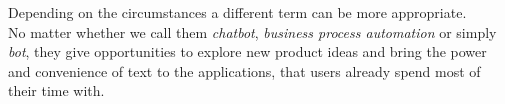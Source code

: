 Depending on the circumstances a different term can be more appropriate.
\\

No matter whether we call them \emph{chatbot}, \emph{business process automation} or simply \emph{bot},
they give opportunities to explore new product ideas and bring the power and convenience of text to the applications, that users already spend most of their time with.
